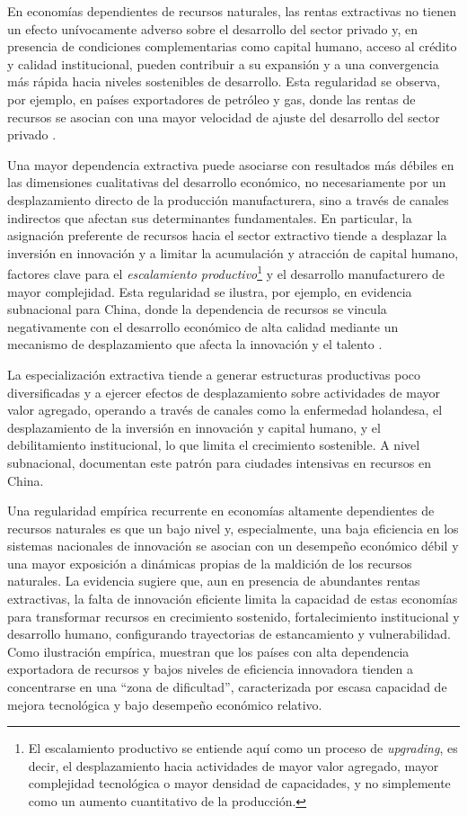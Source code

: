 \documentclass[../../PTFM.tex]{subfiles}
\begin{document}
	En economías dependientes de recursos naturales, las rentas extractivas no tienen un efecto unívocamente adverso sobre el desarrollo del sector privado y, en presencia de condiciones complementarias como capital humano, acceso al crédito y calidad institucional, pueden contribuir a su expansión y a una convergencia más rápida hacia niveles sostenibles de desarrollo. Esta regularidad se observa, por ejemplo, en países exportadores de petróleo y gas, donde las rentas de recursos se asocian con una mayor velocidad de ajuste del desarrollo del sector privado \textcite{Muhamad2020}.
	
	Una mayor dependencia extractiva puede asociarse con resultados más débiles en las dimensiones cualitativas del desarrollo económico, no necesariamente por un desplazamiento directo de la producción manufacturera, sino a través de canales indirectos que afectan sus determinantes fundamentales. En particular, la asignación preferente de recursos hacia el sector extractivo tiende a desplazar la inversión en innovación y a limitar la acumulación y atracción de capital humano, factores clave para el \textit{escalamiento productivo}\footnote{El escalamiento productivo se entiende aquí como un proceso de \textit{upgrading}, es decir, el desplazamiento hacia actividades de mayor valor agregado, mayor complejidad tecnológica o mayor densidad de capacidades, y no simplemente como un aumento cuantitativo de la producción.} y el desarrollo manufacturero de mayor complejidad. Esta regularidad se ilustra, por ejemplo, en evidencia subnacional para China, donde la dependencia de recursos se vincula negativamente con el desarrollo económico de alta calidad mediante un mecanismo de desplazamiento que afecta la innovación y el talento \textcite{Du2020}.
	
	La especialización extractiva tiende a generar estructuras productivas poco diversificadas y a ejercer efectos de desplazamiento sobre actividades de mayor valor agregado, operando a través de canales como la enfermedad holandesa, el desplazamiento de la inversión en innovación y capital humano, y el debilitamiento institucional, lo que limita el crecimiento sostenible. A nivel subnacional, \textcite{Lu2019} documentan este patrón para ciudades intensivas en recursos en China.
	
	Una regularidad empírica recurrente en economías altamente dependientes de recursos naturales es que un bajo nivel y, especialmente, una baja eficiencia en los sistemas nacionales de innovación se asocian con un desempeño económico débil y una mayor exposición a dinámicas propias de la maldición de los recursos naturales. La evidencia sugiere que, aun en presencia de abundantes rentas extractivas, la falta de innovación eficiente limita la capacidad de estas economías para transformar recursos en crecimiento sostenido, fortalecimiento institucional y desarrollo humano, configurando trayectorias de estancamiento y vulnerabilidad. Como ilustración empírica, \textcite{Namazi2018} muestran que los países con alta dependencia exportadora de recursos y bajos niveles de eficiencia innovadora tienden a concentrarse en una “zona de dificultad”, caracterizada por escasa capacidad de mejora tecnológica y bajo desempeño económico relativo.
	
\end{document}
